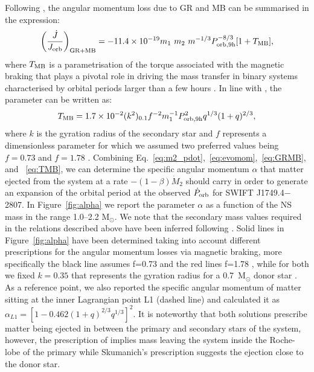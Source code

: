 \documentclass[fleqn,usenatbib]{mnras}
\newcommand{\swiftj}{SWIFT J1749.4$-$2807}
\begin{document}
Following \citet{Burderi:2010tk}, the angular momentum loss due to GR and MB can be summarised in the expression:
\begin{equation} 
\label{eq:GRMB}
\left(\frac{\dot{J}}{J_{\rm orb}}\right)_{\rm GR+MB}=-11.4\times 10^{-19}m_1~m_{2}~m^{-1/3}P_{\rm orb,9h}^{-8/3}[1+T_{\rm MB}],
\end{equation}
where $T_{\rm MB}$ is a parametrisation of the torque associated with the magnetic braking that plays a pivotal role in driving the mass transfer in binary systems characterised by orbital periods larger than a few hours \citep{Verbunt:1993vj}. In line with \citet[][]{Iaria:2018tq}, the parameter can be written as:
\begin{equation}
\label{eq:TMB}	
T_{\rm MB}=1.7\times 10^{-2}(k^2)_{0.1}f^{-2}m_1^{-1}P_{\rm orb,9h}^2q^{1/3}(1+q)^{2/3},
\end{equation}
where $k$ is the gyration radius of the secondary star and $f$ represents a dimensionless parameter for which we assumed two preferred values being $f=0.73$ \citep{Skumanich:1972vy} and $f=1.78$ \citep{Smith:1979vn}.
Combining Eq.~\ref{eq:m2_pdot},~\ref{eq:evomom},~\ref{eq:GRMB}, and ~\ref{eq:TMB}, we can determine the specific angular momentum $\alpha$ that matter ejected from the system at a rate $-(1-\beta)\dot{M}_2$ should carry in order to generate an expansion of the orbital period at the observed $\dot{P}_{\rm orb}$ for \swiftj{}. In Figure~\ref{fig:alpha} we report the parameter $\alpha$ as a function of the NS mass in the range 1.0--2.2 M$_\odot$. We note that the secondary mass values required in the relations described above have been inferred following \citet{Markwardt:2010tl}. Solid lines in Figure~\ref{fig:alpha} have been determined taking into account different prescriptions for the angular momentum losses via magnetic braking, more specifically the black line assumes f=0.73 \citep{Skumanich:1972vy} and the red lines f=1.78 \citep{Smith:1979vn}, while for both we fixed $k=0.35$ that represents the gyration radius for a 0.7~M$_\odot$ donor star \citep[see e.g.,][]{Claret:1990to}. As a reference point, we also reported the specific angular momentum of matter sitting at the inner Lagrangian point L1 (dashed line) and calculated it as $\alpha_{L1}=[1 -0.462(1 + q)^{2/3}q^{1/3}]^2$. It is noteworthy that both solutions prescribe matter being ejected in between the primary and secondary stars of the system, however, the prescription of \citet{Smith:1979vn} implies mass leaving the system inside the Roche-lobe of the primary while Skumanich's prescription suggests the ejection close to the donor star. 
\end{document}
